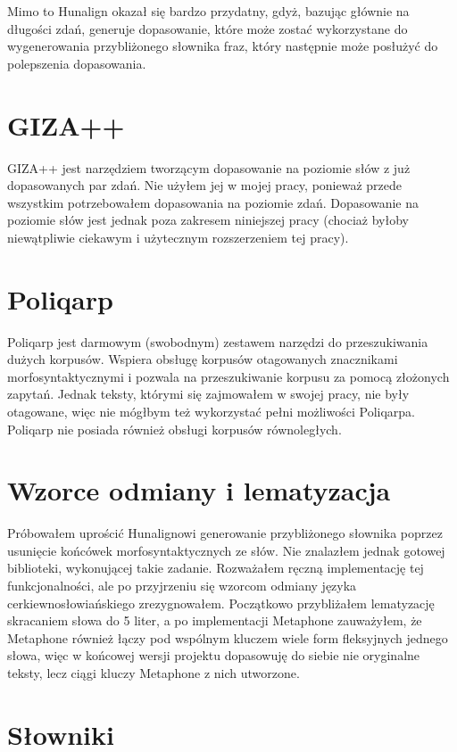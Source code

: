 \documentclass{pracamgr}
\begin{document}
Mimo to Hunalign okazał się bardzo przydatny, gdyż, bazując głównie na
długości zdań, generuje dopasowanie, które może zostać wykorzystane do
wygenerowania przybliżonego słownika fraz, który następnie może
posłużyć do polepszenia dopasowania.

\section{GIZA++}

GIZA++ \cite{giza} jest narzędziem tworzącym dopasowanie na poziomie
słów z już dopasowanych par zdań. Nie użyłem jej w mojej pracy,
ponieważ przede wszystkim potrzebowałem dopasowania na poziomie
zdań. Dopasowanie na poziomie słów jest jednak poza zakresem
niniejszej pracy (chociaż byłoby niewątpliwie ciekawym i użytecznym
rozszerzeniem tej pracy).

\section{Poliqarp}

Poliqarp \cite{poliqarp} jest darmowym (swobodnym) zestawem narzędzi
do przeszukiwania dużych korpusów. Wspiera obsługę korpusów
otagowanych znacznikami morfosyntaktycznymi i pozwala na
przeszukiwanie korpusu za pomocą złożonych zapytań. Jednak teksty,
którymi się zajmowałem w swojej pracy, nie były otagowane, więc nie
mógłbym też wykorzystać pełni możliwości Poliqarpa. Poliqarp nie
posiada również obsługi korpusów równoległych.

\section{Wzorce odmiany i lematyzacja}

Próbowałem uprościć Hunalignowi generowanie przybliżonego słownika
poprzez usunięcie końcówek morfosyntaktycznych ze słów. Nie znalazłem
jednak gotowej biblioteki, wykonującej takie zadanie. Rozważałem
ręczną implementację tej funkcjonalności, ale po przyjrzeniu się
wzorcom odmiany języka cerkiewno\-{}słowiańskiego \cite{strach}
zrezygnowałem. Początkowo przybliżałem lematyzację skracaniem słowa do
5 liter, a po implementacji Metaphone zauważyłem, że Metaphone również
łączy pod wspólnym kluczem wiele form fleksyjnych jednego słowa, więc
w końcowej wersji projektu dopasowuję do siebie nie oryginalne teksty,
lecz ciągi kluczy Metaphone z nich utworzone.

\section{Słowniki}
\end{document}
